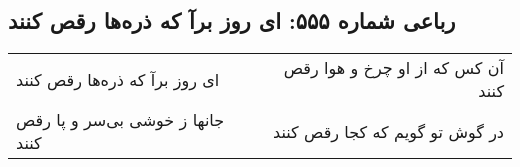 \begin{center}
\section*{رباعی شماره ۵۵۵: ای روز برآ که ذره‌ها رقص کنند}
\label{sec:0555}
\begin{longtable}{l p{0.5cm} r}
ای روز برآ که ذره‌ها رقص کنند
&&
آن کس که از او چرخ و هوا رقص کنند
\\
جانها ز خوشی بی‌سر و پا رقص کنند
&&
در گوش تو گویم که کجا رقص کنند
\\
\end{longtable}
\end{center}
